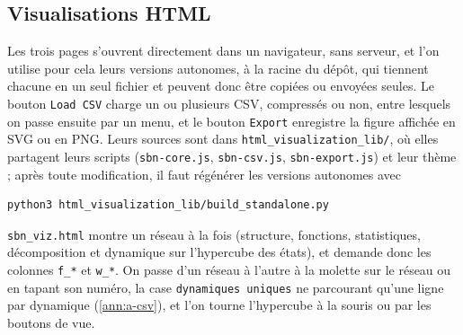 \subsection{Visualisations HTML}
\label{ann:visualisations}


Les trois pages s'ouvrent directement dans un navigateur, sans serveur, et l'on utilise pour cela leurs versions autonomes, à la racine du dépôt, qui tiennent chacune en un seul fichier et peuvent donc être copiées ou envoyées seules.
Le bouton \texttt{Load CSV} charge un ou plusieurs CSV, compressés ou non, entre lesquels on passe ensuite par un menu, et le bouton \texttt{Export} enregistre la figure affichée en SVG ou en PNG.
Leurs sources sont dans \texttt{html\_visualization\_lib/}, où elles partagent leurs scripts (\texttt{sbn-core.js}, \texttt{sbn-csv.js}, \texttt{sbn-export.js}) et leur thème ; après toute modification, il faut régénérer les versions autonomes avec
\begin{verbatim}
python3 html_visualization_lib/build_standalone.py
\end{verbatim}

\texttt{sbn\_viz.html} montre un réseau à la fois (structure, fonctions, statistiques, décomposition et dynamique sur l'hypercube des états), et demande donc les colonnes \texttt{f\_*} et \texttt{w\_*}.
On passe d'un réseau à l'autre à la molette sur le réseau ou en tapant son numéro, la case \texttt{dynamiques uniques} ne parcourant qu'une ligne par dynamique (\cref{ann:a-csv}), et l'on tourne l'hypercube à la souris ou par les boutons de vue.

